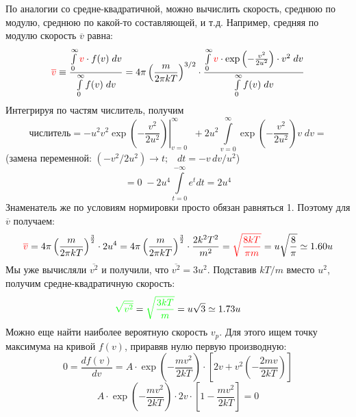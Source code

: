 По аналогии со средне-квадратичной, можно вычислить скорость, сре\-д\-нюю по модулю, среднюю
по какой-то составляющей, и т.д. Например, средняя по модулю скорость {\color{red}$\overline{v}$} равна:
\begin{displaymath}
{\color{red}\overline{v}}\equiv\frac{\int\limits_0^\infty {\color{red}v}\cdot f(v)\;dv}
                         {\int\limits_0^\infty f(v)\;dv}=
4\pi\left(\frac{m}{2\pi kT}\right)^{3/2}\cdot
\frac{\int\limits_0^\infty {\color{red}v}\cdot\exp\left(-\frac{v^2}{2u^2}\right) \cdot v^2\;dv}
                         {\int\limits_0^\infty f(v)\;dv}
\end{displaymath}
Интегрируя по частям числитель, получим
\begin{displaymath}
 \texttt{числитель}=\left.-u^2v^2\exp\left(-\frac{v^2}{2u^2}\right)\right|_{v=0}^\infty\;\;
 +2u^2\int\limits_{v=0}^\infty\exp\left(-\frac{v^2}{2u^2}\right)v\;dv=
\end{displaymath}
(замена переменной: $(-v^2/2u^2)\rightarrow t; \;\;\; dt=-v\,dv/u^2$)
\begin{displaymath}
=0\;-2u^4\int\limits_{t=0}^{-\infty}e^tdt=2u^4
\end{displaymath}
Знаменатель же по условиям нормировки просто обязан равняться 1. Поэтому для  {\color{red}$\overline{v}$} получаем:
\begin{displaymath}
{\color{red}\overline{v}}=
4\pi\left(\frac{m}{2\pi kT}\right)^{\frac32}\cdot2u^4=4\pi\left(\frac{m}{2\pi kT}\right)^{\frac32}\cdot\frac{2k^2T^2}{m^2}={\color{red}\sqrt{\frac{8kT}{\pi m}}}
=u\sqrt{\frac{8}{\pi}}\simeq1.60u
\end{displaymath}
Мы уже вычисляли {\color{green}$\overline{v^2}$} и получили, что $\overline{v^2}=3u^2$. Подставив $kT/m$ вместо $u^2$, получим средне-квадратичную скорость:
\begin{displaymath}
{\color{green}\sqrt{\overline{v^2}}}={\color{green}\sqrt{\frac{3kT}{m}}}=u\sqrt{3}\simeq1.73u
\end{displaymath}
Можно еще найти наиболее вероятную скорость {\color{magenta}$v_p$}.  Для этого ищем точку максимума на кривой $f(v)$, приравяв нулю первую производную:
\begin{displaymath}
0=\frac{df(v)}{dv}=A\cdot\exp\left(-\frac{mv^2}{2kT}\right)\cdot
\left[2v+v^2\left(-\frac{2mv}{2kT}\right)\right]
\end{displaymath}
\begin{displaymath}
A\cdot\exp\left(-\frac{mv^2}{2kT}\right)\cdot2v\cdot
\left[1-\frac{mv^2}{2kT}\right]=0
\end{displaymath}
